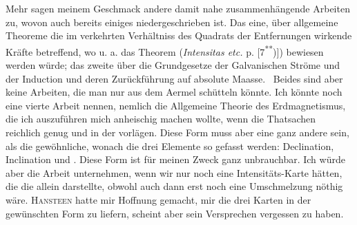 Mehr sagen meinem Geschmack  andere damit nahe zusammenhängende
Arbeiten zu, wovon auch bereits einiges niedergeschrieben ist. Das
eine, über allgemeine Theoreme die im verkehrten Verhältniss des Quadrats
der Entfernungen wirkende Kräfte betreffend, wo u. a. das Theorem (\textit{Intensitas
etc.} p. [7\textsuperscript{**})]) bewiesen werden würde; das zweite über die Grundgesetze der
Galvanischen Ströme und der Induction und deren Zurückführung auf absolute
Maasse.\begingroup\renewcommand{\thefootnote}{}
\endgroup\ Beides sind aber keine Arbeiten, die man nur aus dem Aermel schütteln
könnte. Ich könnte noch eine vierte Arbeit nennen, nemlich die Allgemeine
Theorie des Erdmagnetismus, die ich auszuführen mich anheischig machen
wollte, wenn die Thatsachen reichlich genug und in der  vorlägen. Diese Form muss aber eine ganz andere sein, als die gewöhnliche,
wonach die drei Elemente so gefasst werden: Declination, Inclination
und . Diese Form ist für meinen Zweck ganz unbrauchbar.
Ich würde aber die Arbeit unternehmen, wenn wir nur noch eine Intensitäts-Karte
hätten, die die  allein darstellte, obwohl auch
dann erst noch eine Umschmelzung nöthig wäre. \textsc{Hansteen} hatte mir Hoffnung
gemacht, mir die drei Karten in der gewünschten Form zu liefern,
scheint aber sein Versprechen vergessen zu haben.

